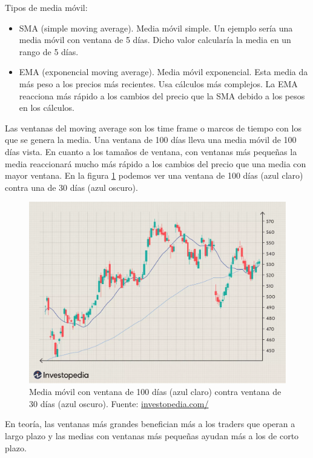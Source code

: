 Tipos de media móvil:

\begin{itemize}
	\item SMA (simple moving average). Media móvil simple. Un ejemplo sería una media móvil con ventana de 5 días. Dicho valor calcularía la media en un rango de 5 días.
	\item EMA (exponencial moving average). Media móvil exponencial. Esta media da más peso a los precios más recientes. Usa cálculos más complejos. La EMA reacciona más rápido a los cambios del precio que la SMA debido a los pesos en los cálculos.
\end{itemize}

Las ventanas del moving average son los time frame o marcos de tiempo con los que se genera la media. Una ventana de 100 días lleva una media móvil de 100 días vista. En cuanto a los tamaños de ventana, con ventanas más pequeñas la media reaccionará mucho más rápido a los cambios del precio que una media con mayor ventana. En la figura \ref{medias_moviles} podemos ver una ventana de 100 días (azul claro) contra una de 30 días (azul oscuro).\newline

\begin{figure}[h]
	\includegraphics[width=1\textwidth]{imagenes/medias_moviles.png}
	\caption{Media móvil con ventana de 100 días (azul claro) contra ventana de 30 días (azul oscuro). Fuente: \href{https://www.investopedia.com/}{investopedia.com/}} \label{medias_moviles}
\end{figure}

En teoría, las ventanas más grandes benefician más a los traders que operan a largo plazo y las medias con ventanas más pequeñas ayudan más a los de corto plazo.\newline

